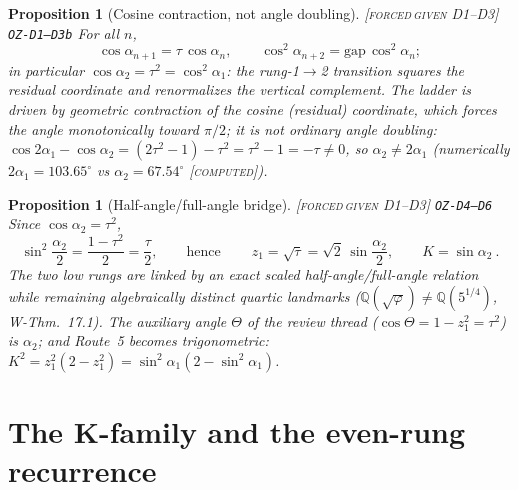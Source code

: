 \documentclass[11pt]{article}
\newcommand{\tagFD}{\textcolor{cF}{\textsc{[forced}}\,\textcolor{cD}{\textsc{given D1--D3]}}}
\newcommand{\tagC}{\textcolor{cC}{\textsc{[computed]}}}
\newcommand{\hx}[1]{\textcolor{cC}{\footnotesize\texttt{#1}}}
\newcommand{\Q}{\mathbb{Q}}
\newcommand{\gp}{\varphi}
\newcommand{\gapc}{\mathrm{gap}}
\theoremstyle{plain}
\newtheorem{proposition}[theorem]{Proposition}
\theoremstyle{definition}
\theoremstyle{remark}
\begin{document}
\begin{proposition}[Cosine contraction, not angle doubling]\label{prop:contraction}\tagFD{} \hx{OZ-D1--D3b}
For all $n$,
\[
\cos\alpha_{n+1}=\tau\,\cos\alpha_n,
\qquad
\cos^2\alpha_{n+2}=\gapc\,\cos^2\alpha_n ;
\]
in particular $\cos\alpha_2=\tau^2=\cos^2\alpha_1$: the rung-1$\to$2
transition squares the residual coordinate and renormalizes the vertical
complement. The ladder is driven by geometric contraction of the cosine
(residual) coordinate, which forces the angle monotonically toward $\pi/2$; it is \emph{not} ordinary angle doubling:
$\cos2\alpha_1-\cos\alpha_2=(2\tau^2-1)-\tau^2=\tau^2-1=-\tau\neq0$, so
$\alpha_2\neq2\alpha_1$ (numerically $2\alpha_1=103.65^\circ$ vs
$\alpha_2=67.54^\circ$ \tagC{}).
\end{proposition}

\begin{proposition}[Half-angle/full-angle bridge]\label{prop:halfangle}\tagFD{} \hx{OZ-D4--D6}
Since $\cos\alpha_2=\tau^2$,
\[
\sin^2\frac{\alpha_2}{2}=\frac{1-\tau^2}{2}=\frac{\tau}{2},
\qquad\text{hence}\qquad
\boxed{\ z_1=\sqrt\tau=\sqrt2\,\sin\frac{\alpha_2}{2},\qquad K=\sin\alpha_2\ }.
\]
The two low rungs are linked by an exact scaled half-angle/full-angle relation
while remaining algebraically distinct quartic landmarks
($\Q(\sqrt\gp)\neq\Q(5^{1/4})$, W-Thm.\ 17.1). The auxiliary angle $\Theta$ of the
review thread ($\cos\Theta=1-z_1^2=\tau^2$) \emph{is} $\alpha_2$; and Route~5
becomes trigonometric: $K^2=z_1^2(2-z_1^2)=\sin^2\alpha_1(2-\sin^2\alpha_1)$.
\end{proposition}

\section{The K-family and the even-rung recurrence}\label{sec:kfamily}
\end{document}
